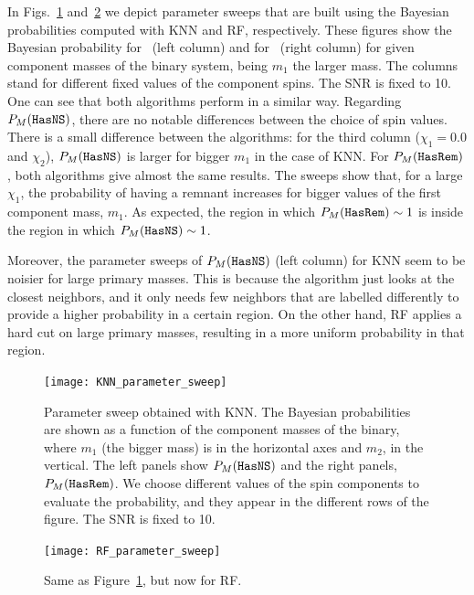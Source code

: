 In Figs.~\ref{fig:param_sweep_KNN} and~\ref{fig:param_sweep_RF} we depict parameter sweeps that are built using the Bayesian probabilities computed with \ac{KNN} and \ac{RF}, respectively.  These figures show the Bayesian probability for \hasns\ (left column) and for \hasrem\ (right column) for given component masses of the binary system, being $m_1$ the larger mass. The  columns stand for different fixed values of the component spins. The SNR is fixed to 10. One can see that both algorithms perform in a similar way. Regarding $P_M({{\tt HasNS}})$,  there are no notable differences between the choice of spin values.  There is a small difference between the algorithms: for the third column ($\chi_1 = 0.0$ and $\chi_2$), $P_M({{\tt HasNS}})$ is larger for bigger $m_1$ in the case of \ac{KNN}. For $P_M({{\tt HasRem}})$, both algorithms give almost the same results. The sweeps show that, for a large $\chi_1$, the probability of having a remnant increases for bigger values of the first component mass, $m_1$. As expected, the region in which $P_M({{\tt HasRem}}) \sim 1$ is inside the region in which $P_M({{\tt HasNS}}) \sim 1$.

Moreover, the parameter sweeps of $P_M({{\tt HasNS}})$ (left column) for \ac{KNN} seem to be noisier for large primary masses. This is because the algorithm just looks at the closest neighbors, and it only needs few neighbors that are labelled differently to provide a higher probability in a certain region. On the other hand, \ac{RF} applies a hard cut on large primary masses, resulting in a more uniform probability in that region. 

\begin{figure}%
\texttt{[image: KNN\_parameter\_sweep]}
    \caption{Parameter sweep obtained with \ac{KNN}. The Bayesian probabilities are shown as a function of the component masses of the binary, where $m_1$ (the bigger mass) is in the horizontal axes and $m_2$, in the vertical. The left panels show $P_M({{\tt HasNS}})$ and the right panels, $P_M({{\tt HasRem}})$. We choose different values of the spin components to evaluate the probability, and they appear in the different rows of the figure.   The SNR is fixed to 10. }
\label{fig:param_sweep_KNN}
\end{figure}

\begin{figure}%
\texttt{[image: RF\_parameter\_sweep]}
 \caption{Same as Figure~\ref{fig:param_sweep_KNN}, but now for \ac{RF}.}
\label{fig:param_sweep_RF}
\end{figure}



